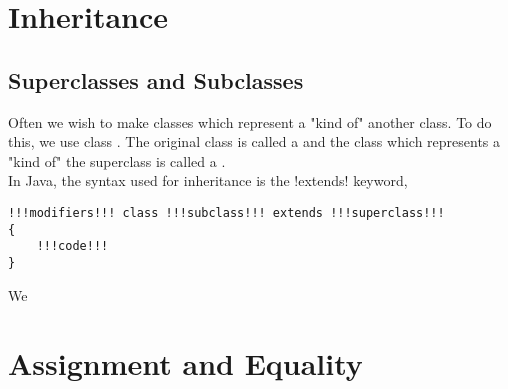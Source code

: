 \documentclass[11pt]{article}
\begin{document}
\section{Inheritance}
\subsection{Superclasses and Subclasses}
Often we wish to make classes which represent a "kind of" another class. To do this, we use class . The original class is called a  and the class which represents a "kind of" the superclass is called a . 
\\ In Java, the syntax used for inheritance is the \inlineJava!extends! keyword, 
\vspace{-20pt}
\begin{lstlisting}[style=javaSyntax]
!!!modifiers!!! class !!!subclass!!! extends !!!superclass!!!
{
    !!!code!!!
}
\end{lstlisting}
\begin{eg}
    We
\end{eg}
\pagebreak
\section{Assignment and Equality}
\end{document}
